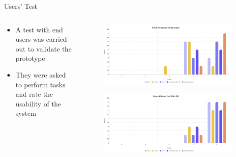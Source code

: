 \begin{frame}{Users' Test}
    

    \begin{columns}
        \begin{column}{0.4\textwidth}
            \begin{itemize}
                \item A test with end users was carried out to validate the prototype
                \item They were asked to perform tasks and rate the usability of the system
            \end{itemize}
        \end{column}
        \begin{column}{0.6\textwidth}
            \vspace{-0.5cm}
            \begin{figure}
                \centering
                \includegraphics[width=\textwidth]{images/intuitiveness.png}
            \end{figure}
            \begin{figure}
                \centering
                \includegraphics[width=\textwidth]{images/easeofuse.png}
            \end{figure}
        \end{column}
    \end{columns}
\end{frame}